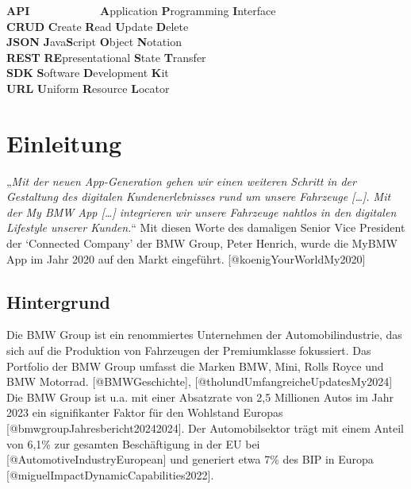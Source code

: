 \documentclass[
  12pt,
  a4paperpaper,
]{report}
\begin{document}
\begin{tabbing}
\textbf{API}~~~~~~~~~~~~ \= \textbf{A}pplication \textbf{P}rogramming \textbf{I}nterface \\  
\textbf{CRUD} \> \textbf{C}reate \textbf{R}ead \textbf{U}pdate \textbf{D}elete \\
\textbf{JSON} \> \textbf{J}ava\textbf{S}cript \textbf{O}bject \textbf{N}otation \\ 
\textbf{REST} \> \textbf{RE}presentational \textbf{S}tate \textbf{T}ransfer \\
\textbf{SDK} \> \textbf{S}oftware \textbf{D}evelopment \textbf{K}it \\
\textbf{URL} \> \textbf{U}niform \textbf{R}esource \textbf{L}ocator \\
\end{tabbing}

\newpage
\setcounter{page}{1}
\renewcommand{\thepage}{\arabic{page}}

\chapter{Einleitung}\label{einleitung}

„\emph{Mit der neuen App-Generation gehen wir einen weiteren Schritt in
der Gestaltung des digitalen Kundenerlebnisses rund um unsere Fahrzeuge
{[}\ldots{]}. Mit der My BMW App {[}\ldots{]} integrieren wir unsere
Fahrzeuge nahtlos in den digitalen Lifestyle unserer Kunden.}`` Mit
diesen Worte des damaligen Senior Vice President der `Connected Company'
der BMW Group, Peter Henrich, wurde die MyBMW App im Jahr 2020 auf den
Markt eingeführt. {[}@koenigYourWorldMy2020{]}

\section{Hintergrund}\label{hintergrund}

Die BMW Group ist ein renommiertes Unternehmen der Automobilindustrie,
das sich auf die Produktion von Fahrzeugen der Premiumklasse fokussiert.
Das Portfolio der BMW Group umfasst die Marken BMW, Mini, Rolls Royce
und BMW Motorrad. {[}@BMWGeschichte{]},
{[}@tholundUmfangreicheUpdatesMy2024{]} Die BMW Group ist u.a. mit einer
Absatzrate von 2,5 Millionen Autos im Jahr 2023 ein signifikanter Faktor
für den Wohlstand Europas {[}@bmwgroupJahresbericht20242024{]}. Der
Automobilsektor trägt mit einem Anteil von 6,1\thinspace\% zur gesamten
Beschäftigung in der EU bei {[}@AutomotiveIndustryEuropean{]} und
generiert etwa 7\thinspace\% des BIP in Europa
{[}@miguelImpactDynamicCapabilities2022{]}.
\end{document}
